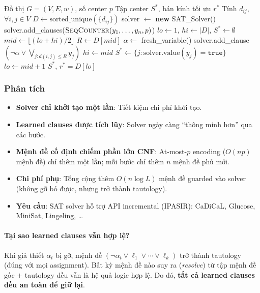 \documentclass[11pt,a4paper]{article}
\begin{document}
\begin{algorithm}[H]
\caption{Incremental SAT cho P-Center}
\label{alg:incremental}
\begin{algorithmic}[1]
\Require Đồ thị $G=(V,E,w)$, số center $p$
\Ensure Tập center $S^*$, bán kính tối ưu $r^*$
\State Tính $d_{ij}$, $\forall i,j \in V$
\State $D \gets \text{sorted\_unique}(\{d_{ij}\})$
\State solver $\gets$ \textbf{new} SAT\_Solver() 
\State solver.add\_clauses($\textsc{SeqCounter}(y_1, \dots, y_n, p)$) 
\State $lo \gets 1$, $hi \gets |D|$, $S^* \gets \emptyset$
    \State $mid \gets \lfloor (lo + hi) / 2 \rfloor$
    \State $R \gets D[mid]$
    \State $\alpha \gets$ fresh\_variable() 
        \State solver.add\_clause$(\neg \alpha \lor \bigvee_{j: d(i,j) \le R} y_j)$ 
    \EndFor
        \State $hi \gets mid$
        \State $S^* \gets \{j : \text{solver.value}(y_j) = \texttt{true}\}$
    \Else
        \State $lo \gets mid + 1$
    \EndIf
\EndWhile
\State \Return $S^*$, $r^* = D[lo]$
\end{algorithmic}
\end{algorithm}

\subsubsection{Phân tích}

\begin{itemize}[nosep]
    \item \textbf{Solver chỉ khởi tạo một lần}: Tiết kiệm chi phí khởi tạo.
    \item \textbf{Learned clauses được tích lũy}: Solver ngày càng ``thông minh hơn'' qua các bước.
    \item \textbf{Mệnh đề cố định chiếm phần lớn CNF}: At-most-$p$ encoding ($O(np)$ mệnh đề) chỉ thêm một lần; mỗi bước chỉ thêm $n$ mệnh đề phủ mới.
    \item \textbf{Chi phí phụ}: Tổng cộng thêm $O(n \log L)$ mệnh đề guarded vào solver (không gỡ bỏ được, nhưng trở thành tautology).
    \item \textbf{Yêu cầu}: SAT solver hỗ trợ API incremental (IPASIR): CaDiCaL, Glucose, MiniSat, Lingeling, \ldots
\end{itemize}

\paragraph{Tại sao learned clauses vẫn hợp lệ?}
Khi giả thiết $\alpha_t$ bị gỡ, mệnh đề $(\neg \alpha_t \lor \ell_1 \lor \cdots \lor \ell_k)$ trở thành tautology (đúng với mọi assignment).
Bất kỳ mệnh đề nào suy ra (\textit{resolve}) từ tập mệnh đề gốc $+$ tautology đều vẫn là hệ quả logic hợp lệ.
Do đó, \textbf{tất cả learned clauses đều an toàn để giữ lại}.
\end{document}
